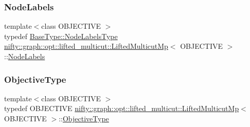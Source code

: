 \subsubsection{\texorpdfstring{Node\+Labels}{NodeLabels}}
{\footnotesize\ttfamily template$<$class O\+B\+J\+E\+C\+T\+I\+VE $>$ \\
typedef \hyperlink{classnifty_1_1graph_1_1opt_1_1common_1_1SolverBase_abefd51561de2fd009f6bed6bef6009ea}{Base\+Type\+::\+Node\+Labels\+Type} \hyperlink{classnifty_1_1graph_1_1opt_1_1lifted__multicut_1_1LiftedMulticutMp}{nifty\+::graph\+::opt\+::lifted\+\_\+multicut\+::\+Lifted\+Multicut\+Mp}$<$ O\+B\+J\+E\+C\+T\+I\+VE $>$\+::\hyperlink{classnifty_1_1graph_1_1opt_1_1lifted__multicut_1_1LiftedMulticutMp_a98651524f908efa229d69761f4fa5491}{Node\+Labels}}

\mbox{\label{classnifty_1_1graph_1_1opt_1_1lifted__multicut_1_1LiftedMulticutMp_a7946ba353b86ff043eff57fd75513b81}} 
\subsubsection{\texorpdfstring{Objective\+Type}{ObjectiveType}}
{\footnotesize\ttfamily template$<$class O\+B\+J\+E\+C\+T\+I\+VE $>$ \\
typedef O\+B\+J\+E\+C\+T\+I\+VE \hyperlink{classnifty_1_1graph_1_1opt_1_1lifted__multicut_1_1LiftedMulticutMp}{nifty\+::graph\+::opt\+::lifted\+\_\+multicut\+::\+Lifted\+Multicut\+Mp}$<$ O\+B\+J\+E\+C\+T\+I\+VE $>$\+::\hyperlink{classnifty_1_1graph_1_1opt_1_1lifted__multicut_1_1LiftedMulticutMp_a7946ba353b86ff043eff57fd75513b81}{Objective\+Type}}

\mbox{\label{classnifty_1_1graph_1_1opt_1_1lifted__multicut_1_1LiftedMulticutMp_ab91bee4414d7854c428bba8f7aadac1f}} 

